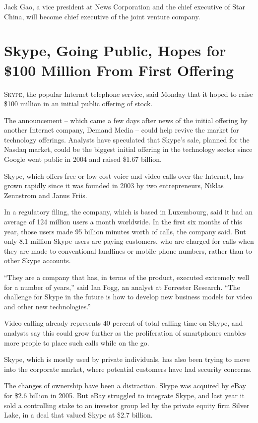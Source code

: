 ﻿\documentclass[12pt]{article}
\begin{document}
Jack Gao, a vice president at News Corporation and the chief executive of Star China, will become
chief executive of the joint venture company.

\section{Skype, Going Public, Hopes for \$100 Million From First Offering}

\lettrine{S}{kype}, the popular Internet telephone service, said Monday that
it hoped to raise \$100 million in an initial public offering of stock.

The announcement -- which came a few days after news of the initial offering by another Internet
company, Demand Media -- could help revive the market for technology offerings. Analysts have
speculated that Skype's sale, planned for the Nasdaq market, could be the biggest initial offering
in the technology sector since Google went public in 2004 and raised \$1.67 billion.

Skype, which offers free or low-cost voice and video calls over the Internet, has grown rapidly
since it was founded in 2003 by two entrepreneurs, Niklas Zennstrom and Janus Friis.

In a regulatory filing, the company, which is based in Luxembourg, said it had an average of 124
million users a month worldwide. In the first six months of this year, those users made 95 billion
minutes worth of calls, the company said. But only 8.1 million Skype users are paying customers, who
are charged for calls when they are made to conventional landlines or mobile phone numbers, rather
than to other Skype accounts.

``They are a company that has, in terms of the product, executed extremely well for a number of
years,'' said Ian Fogg, an analyst at Forrester Research. ``The challenge for Skype in the future is
how to develop new business models for video and other new technologies.''

Video calling already represents 40 percent of total calling time on Skype, and analysts say this
could grow further as the proliferation of smartphones enables more people to place such calls while
on the go.

Skype, which is mostly used by private individuals, has also been trying to move into the corporate
market, where potential customers have had security concerns.

The changes of ownership have been a distraction. Skype was acquired by eBay for \$2.6 billion in
2005. But eBay struggled to integrate Skype, and last year it sold a controlling stake to an
investor group led by the private equity firm Silver Lake, in a deal that valued Skype at \$2.7
billion.
\end{document}
